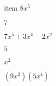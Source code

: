 \documentclass{article}
\begin{document}
\begin{multicols}{2}
item $8x^{5}$\item $7$\item $7x^{5}+3x^{4}-2x^2$\item $5$\item $x^2$\item $(9x^2)(5x^{4})$\item
\end{multicols}
\end{document}
